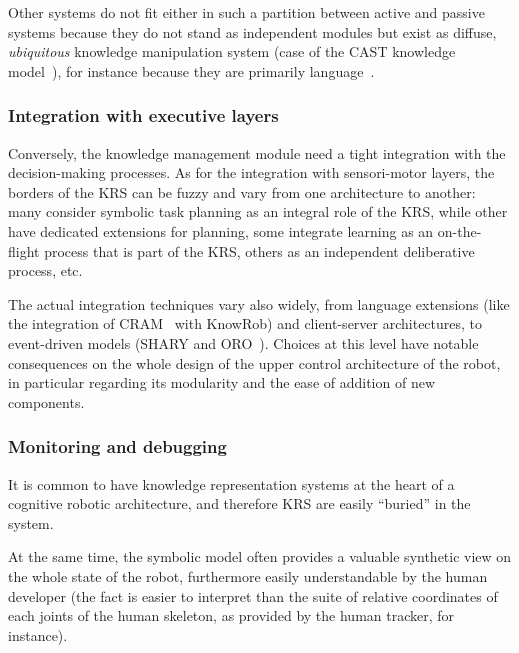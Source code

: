 
Other systems do not fit either in such a partition between active and passive
systems because they do not stand as independent modules but exist as diffuse,
\emph{ubiquitous} knowledge manipulation system (case of the CAST knowledge
model~\cite{Jacobsson2008}), for instance because they are primarily
language~\cite{Ferrein2008, Sabri2011}.

\subsubsection{Integration with executive layers}
\label{sect|integration-executive-layers}

Conversely, the knowledge management module need a tight integration with the
decision-making processes. As for the integration with sensori-motor
layers, the borders of the KRS can be fuzzy and vary from one architecture to
another: many consider symbolic task planning as an integral role of the KRS,
while other have dedicated extensions for planning, some integrate learning as
an on-the-flight process that is part of the KRS, others as an independent
deliberative process, etc.

The actual integration techniques vary also widely, from language extensions
(like the integration of CRAM~\cite{Beetz2010} with KnowRob) and client-server
architectures, to event-driven models (SHARY and ORO~\cite{Alami2011}). Choices
at this level have notable consequences on the whole design of the upper
control architecture of the robot, in particular regarding its modularity and
the ease of addition of new components.

\subsubsection{Monitoring and debugging}
\label{sect|debugging}

It is common to have knowledge representation systems at the heart of a
cognitive robotic architecture, and therefore KRS are easily ``buried'' in the
system.

At the same time, the symbolic model often provides a valuable synthetic view
on the whole state of the robot, furthermore easily understandable by the human
developer (the fact  is easier to interpret than
the suite of relative coordinates of each joints of the human skeleton, as
provided by the human tracker, for instance).

